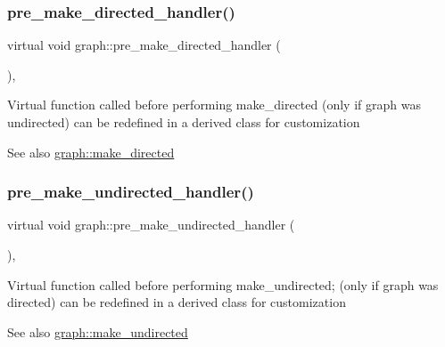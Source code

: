 \subsubsection{\texorpdfstring{pre\+\_\+make\+\_\+directed\+\_\+handler()}{pre\_make\_directed\_handler()}}
{\footnotesize\ttfamily virtual void graph\+::pre\+\_\+make\+\_\+directed\+\_\+handler (\begin{DoxyParamCaption}{ }\end{DoxyParamCaption})\hspace{0.3cm}{\ttfamily [inline]}, {\ttfamily [virtual]}}

Virtual function called before performing make\+\_\+directed (only if graph was undirected) can be redefined in a derived class for customization

\begin{DoxySeeAlso}{See also}
\mbox{\hyperlink{classgraph_a1615678dee6248d6d8a00c553770b3bd}{graph\+::make\+\_\+directed}} 
\end{DoxySeeAlso}
\mbox{\label{classgraph_a8964107991e6f411ba8992f6b1deda21}} 
\subsubsection{\texorpdfstring{pre\+\_\+make\+\_\+undirected\+\_\+handler()}{pre\_make\_undirected\_handler()}}
{\footnotesize\ttfamily virtual void graph\+::pre\+\_\+make\+\_\+undirected\+\_\+handler (\begin{DoxyParamCaption}{ }\end{DoxyParamCaption})\hspace{0.3cm}{\ttfamily [inline]}, {\ttfamily [virtual]}}

Virtual function called before performing make\+\_\+undirected; (only if graph was directed) can be redefined in a derived class for customization

\begin{DoxySeeAlso}{See also}
\mbox{\hyperlink{classgraph_a31c8b895bd842f1b9dcc67649956cfc7}{graph\+::make\+\_\+undirected}} 
\end{DoxySeeAlso}
\mbox{\label{classgraph_ae57c6789ea5945e32fca200163e44d8b}} 
